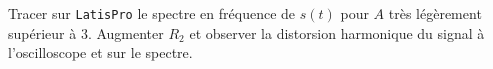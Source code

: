\begin{protocole}
{}
\item Tracer sur \texttt{LatisPro} le spectre en fréquence de $s(t)$ pour $A$ très légèrement supérieur à  $3$. Augmenter $R_2$ et observer la distorsion harmonique du signal à l’oscilloscope et sur le spectre.
\end{protocole}


